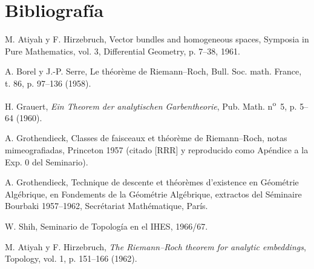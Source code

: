 \section*{Bibliografía}
\begin{enumerate}[label={[\arabic*]},leftmargin=2.5em]
\item M. Atiyah y F. Hirzebruch, Vector bundles and homogeneous spaces, Symposia in Pure Mathematics, vol. 3, Differential Geometry, p. 7--38, 1961.
\item A. Borel y J.-P. Serre, Le th\'eor\`eme de Riemann--Roch, Bull. Soc. math. France, t. 86, p. 97--136 (1958).
\item H. Grauert, \emph{Ein Theorem der analytischen Garbentheorie}, Pub. Math. n\textsuperscript{o}~5, p. 5--64 (1960).
\item A. Grothendieck, Classes de faisceaux et th\'eor\`eme de Riemann--Roch, notas mimeografiadas, Princeton 1957 (citado [RRR] y reproducido como Apéndice a la Exp. 0 del Seminario).
\item A. Grothendieck, Technique de descente et th\'eor\`emes d'existence en G\'eom\'etrie Alg\'ebrique, en Fondements de la G\'eom\'etrie Alg\'ebrique, extractos del Séminaire Bourbaki 1957--1962, Secrétariat Mathématique, París.
\item W. Shih, Seminario de Topología en el IHES, 1966/67.
\item M. Atiyah y F. Hirzebruch, \emph{The Riemann--Roch theorem for analytic embeddings}, Topology, vol. 1, p. 151--166 (1962).
\end{enumerate}



\clearpage

